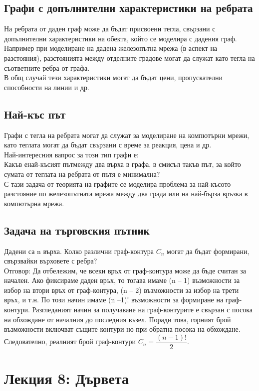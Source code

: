 \documentclass[fleqn, 12pt]{article}
\theoremstyle{definition}
\begin{document}
\subsection{Графи с допълнителни характеристики на ребрата}
На ребрата от даден граф може да бъдат присвоени тегла, свързани с допълнителни характеристики на обекта, който се моделира с дадения граф. Например при моделиране на дадена железопътна мрежа (в аспект на разстояния), разстоянията между отделните градове могат да служат като тегла на съответните ребра от графа.\\
В общ случай тези характеристики могат да бъдат цени, пропускателни способности на линии и др.

\subsection{Най-къс път}
Графи с тегла на ребрата могат да служат за моделиране на компютърни мрежи, като теглата могат да бъдат свързани с време за реакция, цена и др.\\
Най-интересния вапрос за този тип графи е:\\
Какъв енай-късият пътмежду два върха в графа, в смисъл такъв път, за който сумата от теглата на ребрата от пътя е минимална?\\
С тази задача от теорията на графите се моделира проблема за най-късото разстояние по железопътната мрежа между два града или на най-бърза връзка в компютърна мрежа.

\subsection{Задача на търговския пътник}
Дадени са n върха. Колко различни граф-контура $C_n$ могат да бъдат формирани, свързвайки върховете с ребра?\\
Отговор: Да отбележим, че всеки връх от граф-контура може да бъде считан за начален. Ако фиксираме даден връх, то тогава имаме (n – 1) възможности за избор на втори връх от граф-контура, (n – 2) възможности за избор на трети връх, и т.н. По този начин имаме (n –1)! възможности за формиране на граф-контури. Разгледаният начин за получаване на граф-контурите е свързан с посока на обхождане от началния до последния възел. Поради това, горният брой възможности включват същите контури но при обратна посока на обхождане. Следователно, реалният брой граф-контури $C_n= \dfrac{(n - 1)!}{2}$.

\newpage
\section{Лекция 8: Дървета }
\end{document}
